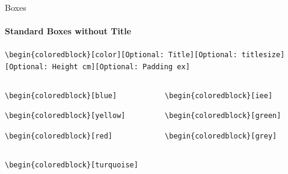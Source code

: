 \documentclass[aspectratio=169]{beamer}
\begin{document}
\begin{frame}{Boxes}
    \framesubtitle{Standard Boxes without Title}

    \begin{coloredblock}[grey]
        \footnotesize\centering\texttt{\textbackslash begin\{coloredblock\}[color][Optional:~Title][Optional:~titlesize][Optional:~Height cm][Optional:~Padding ex]}
    \end{coloredblock}

    \vspace{-1.1cm}
    \begin{columns}
        \begin{column}{0.49\textwidth}

            \begin{coloredblock}[blue]
                \footnotesize\footnotesize\texttt{\textbackslash begin\{coloredblock\}[blue]}\strut
            \end{coloredblock}
    
            \begin{coloredblock}[yellow]
                \footnotesize\texttt{\textbackslash begin\{coloredblock\}[yellow]}\strut
            \end{coloredblock}
    
            \begin{coloredblock}[red]
                \footnotesize\texttt{\textbackslash begin\{coloredblock\}[red]}\strut
            \end{coloredblock}

        \end{column}
        \begin{column}{0.49\textwidth}
        
            \begin{coloredblock}[iee]
                \footnotesize\texttt{\textbackslash begin\{coloredblock\}[iee]}\strut
            \end{coloredblock}
    
            \begin{coloredblock}[green]
                \footnotesize\texttt{\textbackslash begin\{coloredblock\}[green]}\strut
            \end{coloredblock}
    
            \begin{coloredblock}[grey]
                \footnotesize\texttt{\textbackslash begin\{coloredblock\}[grey]}\strut
            \end{coloredblock}
        
        \end{column}
    \end{columns}

    \centering
    \begin{minipage}[t]{0.49\textwidth}
        \begin{coloredblock}[turquoise]
                \footnotesize\texttt{\textbackslash begin\{coloredblock\}[turquoise]}\strut
        \end{coloredblock}
    \end{minipage}
\end{frame}
\end{document}
